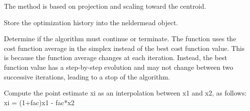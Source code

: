 \begin{Details}
\begin{description}
\begin{itemize}
\end{itemize}

The method is based on projection and scaling toward the centroid.
\item[\code{neldermead.storehistory}] Store the optimization history into the
neldermead object.
\item[\code{neldermead.termination}] Determine if the algorithm must continue
or terminate. The function uses the cost function average in the simplex
instead of the best cost function value. This is because the function
average changes at each iteration. Instead, the best function value has a
step-by-step evolution and may not change between two successive iterations,
leading to a stop of the algorithm.
\item[\code{neldermead.interpolate}] Compute the point estimate xi as an
interpolation between x1 and x2, as follows:  xi = (1+fac)x1 - fac*x2

\end{description}

\end{Details}
%
